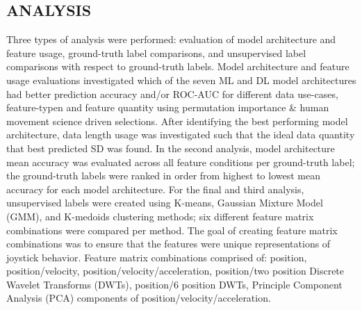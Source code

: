 \documentclass{ieeeaccess}
\begin{document}
\subsection{ANALYSIS}
Three types of analysis were performed: evaluation of model architecture and feature usage, ground-truth label comparisons, and unsupervised label comparisons with respect to ground-truth labels. Model architecture and feature usage evaluations investigated which of the seven ML and DL model architectures had better prediction accuracy and/or ROC-AUC for different data use-cases, feature-typen and feature quantity using permutation importance \& human movement science driven selections. After identifying the best performing model architecture, data length usage was investigated such that the ideal data quantity that best predicted SD was found. In the second analysis, model architecture mean accuracy was evaluated across all feature conditions per ground-truth label; the ground-truth labels were ranked in order from highest to lowest mean accuracy for each model architecture. For the final and third analysis, unsupervised labels were created using K-means, Gaussian Mixture Model (GMM), and K-medoids clustering methods; six different feature matrix combinations were compared per method. The goal of creating feature matrix combinations was to ensure that the features were unique representations of joystick behavior. Feature matrix combinations comprised of: position, position/velocity, position/velocity/acceleration, position/two position Discrete Wavelet Transforms (DWTs), position/6 position DWTs, Principle Component Analysis (PCA) components of position/velocity/acceleration. 
\end{document}
